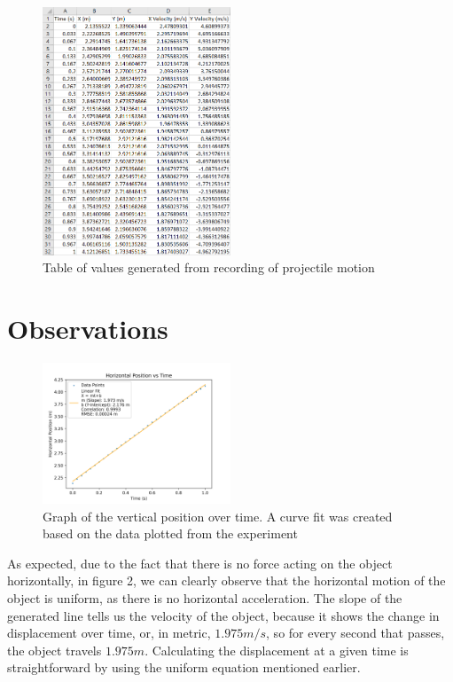 \documentclass[10pt,twocolumn,letterpaper]{article}
\begin{document}
\begin{figure}
  \centering
  \includegraphics[width=0.5\textwidth]{figures/EXCEL_Jr3LyFPYsU.png}
  \caption{Table of values generated from recording of projectile motion}
\end{figure}

\section{Observations}

\begin{figure}
  \centering
  \includegraphics[width=0.5\textwidth]{figures/distance_vs_time.png}
  \caption{Graph of the vertical position over time. A curve fit was created based on the data plotted from the experiment}
\end{figure}

As expected, due to the fact that there is no force acting on the object horizontally, in figure 2, we can clearly observe that the horizontal motion of the object is uniform, as there is no horizontal acceleration. The slope of the generated line tells us the velocity of the object, because it shows the change in displacement over time, or, in metric, \(1.975 m/s\), so for every second that passes, the object travels \(1.975m\). Calculating the displacement at a given time is straightforward by using the uniform equation mentioned earlier.
\end{document}
